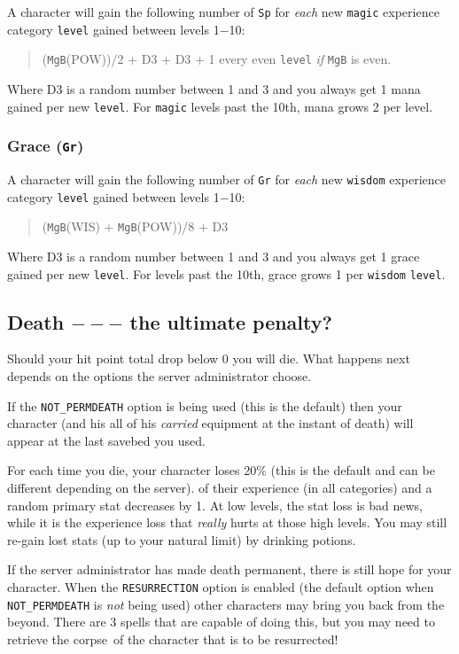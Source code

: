 A character will gain the following number of {\tt Sp} for {\em each} new
{\tt magic} experience category {\tt level} gained between levels 1$-$10:
\begin{quote}
({\tt MgB}(POW))/2 + D3 + D3 + 1 every even {\tt level} {\em if} {\tt MgB} is even.
\end{quote}
Where D3 is a random number between 1 and 3 and you always get 1 mana gained
per new {\tt level}. For {\tt magic} levels past the 10th, mana grows 2 per level.


\subsubsection{Grace ({\tt Gr})}

A character will gain the following number of {\tt Gr} for {\em each} new
{\tt wisdom} experience category {\tt level} gained between levels 1$-$10:
\begin{quote}
({\tt MgB}(WIS) + {\tt MgB}(POW))/8 + D3
\end{quote}
Where D3 is a random number between 1 and 3 and you always get 1 grace gained
per new {\tt level}. For levels past the 10th,
grace grows 1 per {\tt wisdom} {\tt level}.

\subsection{Death $---$ the ultimate penalty?}\label{sec:death}

Should your hit point total drop below 0 you will die.
What happens next depends on the options the server administrator choose.

If the {\tt NOT\_PERMDEATH} option is being used (this is the default) then your character
 (and his all of his {\em carried}
equipment at the instant of death) will appear at the last savebed you used.

For each time you die, your character loses 20\% (this is the default and can be different
depending on the server).
of their experience (in all categories) and a random primary stat decreases by 1.
At low levels, the stat loss is bad news, while it is the experience loss that
{\em really} hurts at those high levels. You may still re-gain lost stats (up to your
natural limit) by drinking potions.

If the server administrator has made death permanent, there is still hope
for your character. When the {\tt RESURRECTION} option is enabled (the default option
when {\tt NOT\_PERMDEATH} is {\em not} being used) other characters may bring you back
from the beyond. There are 3 spells that are capable of doing this, but
you may need to retrieve the corpse\ of the character
that is to be resurrected!


